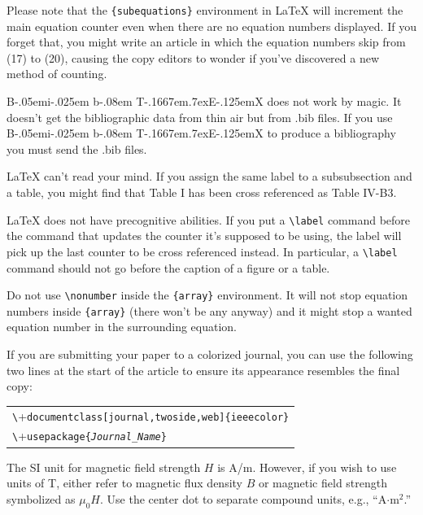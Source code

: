 \documentclass[journal,twoside,web]{ieeecolor2}
\def\BibTeX{{\rm B\kern-.05em{\sc i\kern-.025em b}\kern-.08em
    T\kern-.1667em\lower.7ex\hbox{E}\kern-.125emX}}
\begin{document}
Please note that the \verb|{subequations}| environment in {\LaTeX}
will increment the main equation counter even when there are no
equation numbers displayed.
If you forget that, you might write an
article in which the equation numbers skip from (17) to (20), causing
the copy editors to wonder if you've discovered a new method of
counting.

{\BibTeX} does not work by magic.
It doesn't get the bibliographic
data from thin air but from .bib files.
If you use {\BibTeX} to produce a
bibliography you must send the .bib files.


{\LaTeX} can't read your mind.
If you assign the same label to a
subsubsection and a table, you might find that Table I has been cross
referenced as Table IV-B3.


{\LaTeX} does not have precognitive abilities.
If you put a
\verb|\label| command before the command that updates the counter it's
supposed to be using, the label will pick up the last counter to be
cross referenced instead.
In particular, a \verb|\label| command
should not go before the caption of a figure or a table.

Do not use \verb|\nonumber| inside the \verb|{array}| environment.
It
will not stop equation numbers inside \verb|{array}| (there won't be
any anyway) and it might stop a wanted equation number in the
surrounding equation.

If you are submitting your paper to a colorized journal, you can use
the following two lines at the start of the article to ensure its
appearance resembles the final copy:

\smallskip\noindent
\begin{small}
\begin{tabular}{l}
\verb+\+\texttt{documentclass[journal,twoside,web]\{ieeecolor\}}\\
\verb+\+\texttt{usepackage\{\textit{Journal\_Name}\}}
\end{tabular}
\end{small}

The SI unit for magnetic field strength $H$ is A/m.
However, if you wish to use 
units of T, either refer to magnetic flux density $B$ or magnetic field 
strength symbolized as $\mu _{0}H$.
Use the center dot to separate 
compound units, e.g., ``A$\cdot $m$^{2}$.''
\end{document}
